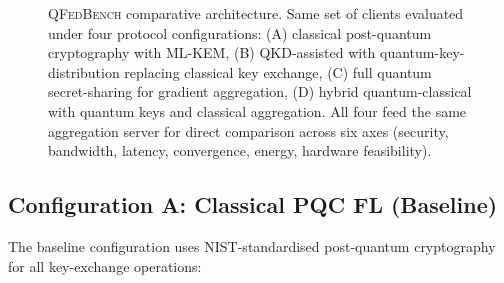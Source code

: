 \documentclass[sigconf,nonacm]{acmart}
\begin{document}
\begin{figure}[t]
\caption{\textsc{QFedBench} comparative architecture. Same set of
  clients evaluated under four protocol configurations: (A)
  classical post-quantum cryptography with ML-KEM, (B)
  QKD-assisted with quantum-key-distribution replacing classical
  key exchange, (C) full quantum secret-sharing for gradient
  aggregation, (D) hybrid quantum-classical with quantum keys and
  classical aggregation. All four feed the same aggregation server
  for direct comparison across six axes (security, bandwidth,
  latency, convergence, energy, hardware feasibility).}
\label{fig:framework}
\end{figure}

\subsection{Configuration A: Classical PQC FL (Baseline)}

The baseline configuration uses NIST-standardised post-quantum
cryptography for all key-exchange operations:
\end{document}
